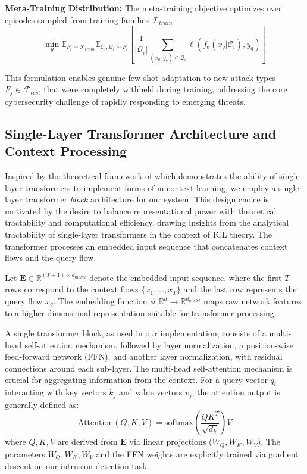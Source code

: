 \documentclass[journal]{IEEEtran}
\begin{document}
\textbf{Meta-Training Distribution:} The meta-training objective optimizes over episodes sampled from training families $\mathcal{F}_{train}$:
\begin{equation}
\min_\theta \mathbb{E}_{F_i \sim \mathcal{F}_{train}} \mathbb{E}_{\mathcal{C}_i, \mathcal{Q}_i \sim F_i} \left[ \frac{1}{|\mathcal{Q}_i|} \sum_{(x_q, y_q) \in \mathcal{Q}_i} \ell(f_\theta(x_q | \mathcal{C}_i), y_q) \right]
\end{equation}

This formulation enables genuine few-shot adaptation to new attack types $F_j \in \mathcal{F}_{test}$ that were completely withheld during training, addressing the core cybersecurity challenge of rapidly responding to emerging threats.

\subsection{Single-Layer Transformer Architecture and Context Processing}

Inspired by the theoretical framework of \cite{akyurek2022learning} which demonstrates the ability of single-layer transformers to implement forms of in-context learning, we employ a single-layer transformer \textit{block} architecture for our system. This design choice is motivated by the desire to balance representational power with theoretical tractability and computational efficiency, drawing insights from the analytical tractability of single-layer transformers in the context of ICL theory. The transformer processes an embedded input sequence that concatenates context flows and the query flow.

Let $\mathbf{E} \in \mathbb{R}^{(T+1) \times d_{model}}$ denote the embedded input sequence, where the first $T$ rows correspond to the context flows $\{x_1, \dots, x_T\}$ and the last row represents the query flow $x_q$. The embedding function $\phi: \mathbb{R}^d \rightarrow \mathbb{R}^{d_{model}}$ maps raw network features to a higher-dimensional representation suitable for transformer processing.

A single transformer block, as used in our implementation, consists of a multi-head self-attention mechanism, followed by layer normalization, a position-wise feed-forward network (FFN), and another layer normalization, with residual connections around each sub-layer. The multi-head self-attention mechanism is crucial for aggregating information from the context. For a query vector $q_i$ interacting with key vectors $k_j$ and value vectors $v_j$, the attention output is generally defined as:
\begin{equation}
\text{Attention}(Q, K, V) = \text{softmax}\left(\frac{QK^T}{\sqrt{d_k}}\right)V
\label{eq:attention}
\end{equation}
where $Q, K, V$ are derived from $\mathbf{E}$ via linear projections ($W_Q, W_K, W_V$). The parameters $W_Q, W_K, W_V$ and the FFN weights are explicitly trained via gradient descent on our intrusion detection task.
\end{document}
